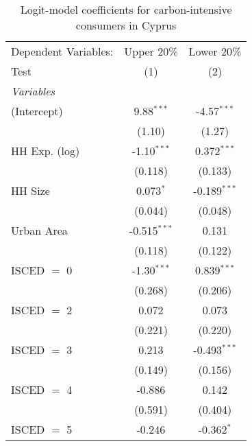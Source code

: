 
\begin{table}[htbp!]
   \centering
   \small
   \begin{adjustbox}{width = 1\textwidth, max height = 0.95\textheight, center}
      \begin{threeparttable}[b]
         \caption{\label{tab:Logit_1_CYP} Logit-model coefficients for carbon-intensive consumers in Cyprus}
         \begin{tabular}{lcc}
            \tabularnewline \midrule \midrule
            Dependent Variables: & Upper 20\%     & Lower 20\%\\   
            Test                 & (1)            & (2)\\  
            \midrule
            \emph{Variables}\\
            (Intercept)          & 9.88$^{***}$   & -4.57$^{***}$\\   
                                 & (1.10)         & (1.27)\\   
            HH Exp. (log)        & -1.10$^{***}$  & 0.372$^{***}$\\   
                                 & (0.118)        & (0.133)\\   
            HH Size              & 0.073$^{*}$    & -0.189$^{***}$\\   
                                 & (0.044)        & (0.048)\\   
            Urban Area           & -0.515$^{***}$ & 0.131\\   
                                 & (0.118)        & (0.122)\\   
            ISCED $=$ 0          & -1.30$^{***}$  & 0.839$^{***}$\\   
                                 & (0.268)        & (0.206)\\   
            ISCED $=$ 2          & 0.072          & 0.073\\   
                                 & (0.221)        & (0.220)\\   
            ISCED $=$ 3          & 0.213          & -0.493$^{***}$\\   
                                 & (0.149)        & (0.156)\\   
            ISCED $=$ 4          & -0.886         & 0.142\\   
                                 & (0.591)        & (0.404)\\   
            ISCED $=$ 5          & -0.246         & -0.362$^{*}$\\   

\end{tabular}
\end{threeparttable}
\end{adjustbox}
\end{table}
